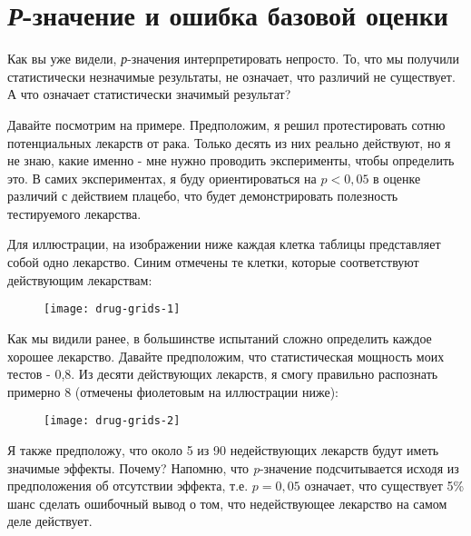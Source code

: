 \chapter[Ошибка базовой оценки]{\emph{Р}-значение и ошибка базовой оценки}
\label{chp5}

Как вы уже видели, \emph{р}-значения интерпретировать непросто. То, что мы получили статистически незначимые результаты, не означает, что различий не существует. А что означает статистически значимый результат?

Давайте посмотрим на примере. Предположим, я решил протестировать сотню потенциальных лекарств от рака. Только десять из них реально действуют, но я не знаю, какие именно - мне нужно проводить эксперименты, чтобы определить это. В самих экспериментах, я буду ориентироваться на $p<0,05$ в оценке различий с действием плацебо, что будет демонстрировать полезность тестируемого лекарства. 

Для иллюстрации, на изображении ниже каждая клетка таблицы представляет собой одно лекарство. Синим отмечены те клетки, которые соответствуют действующим лекарствам:


\newpage %

\begin{figure}[h!]
    \centering
    \texttt{[image: drug-grids-1]}
    \label{fig5:drug-grid-1}
\end{figure}

Как мы видили ранее, в большинстве испытаний сложно определить каждое хорошее лекарство. Давайте предположим, что статистическая мощность моих тестов - 0,8. Из десяти действующих лекарств, я смогу правильно распознать примерно 8 (отмечены фиолетовым на иллюстрации ниже):


\begin{figure}[h!]
    \centering
    \texttt{[image: drug-grids-2]}
    \label{fig5:drug-grid-2}
\end{figure}


Я также предположу, что около 5 из 90 недействующих лекарств будут иметь значимые эффекты. Почему? Напомню, что \emph{p}-значение подсчитывается исходя из предположения об отсутствии эффекта, т.е. $ p =0,05$ означает, что существует 5\% шанс сделать ошибочный вывод о том, что недействующее лекарство на самом деле действует.

